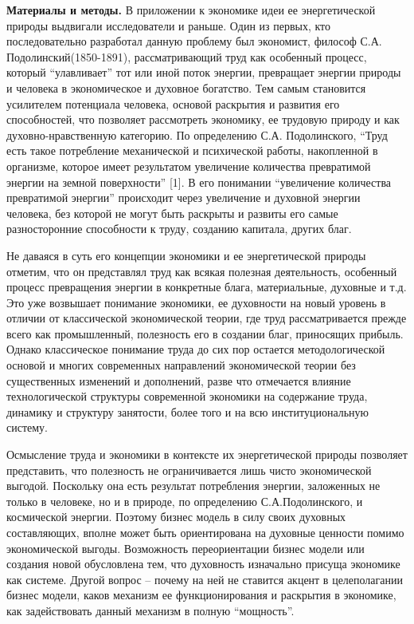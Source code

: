 {\bfseries Материалы и методы.} В приложении к экономике идеи ее
энергетической природы выдвигали исследователи и раньше. Один из первых,
кто последовательно разработал данную проблему был экономист, философ
С.А. Подолинский(1850-1891), рассматривающий труд как особенный процесс,
который ``улавливает'' тот или иной поток энергии, превращает энергии
природы и человека в экономическое и духовное богатство. Тем самым
становится усилителем потенциала человека, основой раскрытия и развития
его способностей, что позволяет рассмотреть экономику, ее трудовую
природу и как духовно-нравственную категорию. По определению С.А.
Подолинского, ``Труд есть такое потребление механической и психической
работы, накопленной в организме, которое имеет результатом увеличение
количества превратимой энергии на земной поверхности'' {[}1{]}. В его
понимании ``увеличение количества превратимой энергии'' происходит через
увеличение и духовной энергии человека, без которой не могут быть
раскрыты и развиты его самые разносторонние способности к труду,
созданию капитала, других благ.

Не даваяся в суть его концепции экономики и ее энергетической природы
отметим, что он представлял труд как всякая полезная деятельность,
особенный процесс превращения энергии в конкретные блага, материальные,
духовные и т.д. Это уже возвышает понимание экономики, ее духовности на
новый уровень в отличии от классической экономической теории, где труд
рассматривается прежде всего как промышленный, полезность его в создании
благ, приносящих прибыль. Однако классическое понимание труда до сих пор
остается методологической основой и многих современных направлений
экономической теории без существенных изменений и дополнений, разве что
отмечается влияние технологической структуры современной экономики на
содержание труда, динамику и структуру занятости, более того и на всю
институциональную систему.

Осмысление труда и экономики в контексте их энергетической природы
позволяет представить, что полезность не ограничивается лишь чисто
экономической выгодой. Поскольку она есть результат потребления энергии,
заложенных не только в человеке, но и в природе, по определению
С.А.Подолинского, и космической энергии. Поэтому бизнес модель в силу
своих духовных составляющих, вполне может быть ориентирована на духовные
ценности помимо экономической выгоды. Возможность переориентации бизнес
модели или создания новой обусловлена тем, что духовность изначально
присуща экономике как системе. Другой вопрос -- почему на ней не
ставится акцент в целеполагании бизнес модели, каков механизм ее
функционирования и раскрытия в экономике, как задействовать данный
механизм в полную ``мощность''.

